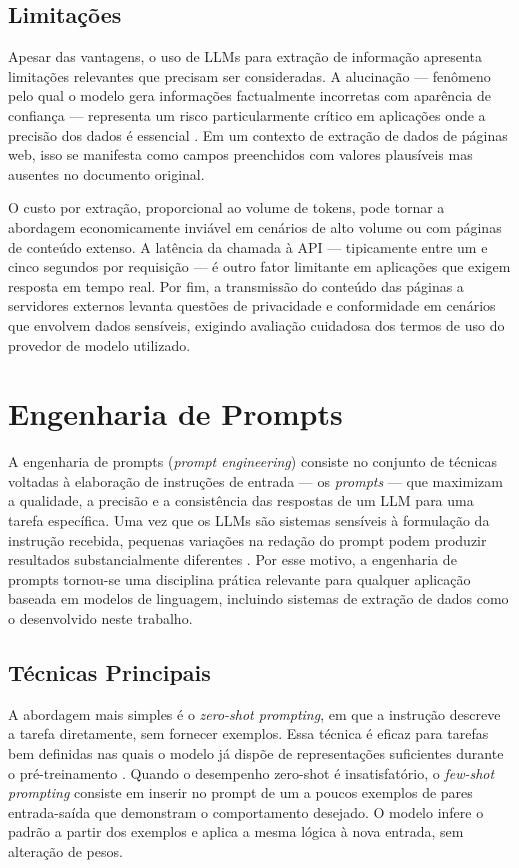 \documentclass[tcc,capa]{texifsul}
\begin{document}
\subsection*{Limitações}

Apesar das vantagens, o uso de LLMs para extração de informação apresenta limitações relevantes que precisam ser consideradas. A alucinação — fenômeno pelo qual o modelo gera informações factualmente incorretas com aparência de confiança — representa um risco particularmente crítico em aplicações onde a precisão dos dados é essencial \cite{OpenAI2023}. Em um contexto de extração de dados de páginas web, isso se manifesta como campos preenchidos com valores plausíveis mas ausentes no documento original.

O custo por extração, proporcional ao volume de tokens, pode tornar a abordagem economicamente inviável em cenários de alto volume ou com páginas de conteúdo extenso. A latência da chamada à API — tipicamente entre um e cinco segundos por requisição — é outro fator limitante em aplicações que exigem resposta em tempo real. Por fim, a transmissão do conteúdo das páginas a servidores externos levanta questões de privacidade e conformidade em cenários que envolvem dados sensíveis, exigindo avaliação cuidadosa dos termos de uso do provedor de modelo utilizado.

\section{Engenharia de Prompts}

A engenharia de prompts (\textit{prompt engineering}) consiste no conjunto de técnicas voltadas à elaboração de instruções de entrada — os \textit{prompts} — que maximizam a qualidade, a precisão e a consistência das respostas de um LLM para uma tarefa específica. Uma vez que os LLMs são sistemas sensíveis à formulação da instrução recebida, pequenas variações na redação do prompt podem produzir resultados substancialmente diferentes \cite{Zhao2023}. Por esse motivo, a engenharia de prompts tornou-se uma disciplina prática relevante para qualquer aplicação baseada em modelos de linguagem, incluindo sistemas de extração de dados como o desenvolvido neste trabalho.

\subsection*{Técnicas Principais}

A abordagem mais simples é o \textit{zero-shot prompting}, em que a instrução descreve a tarefa diretamente, sem fornecer exemplos. Essa técnica é eficaz para tarefas bem definidas nas quais o modelo já dispõe de representações suficientes durante o pré-treinamento \cite{Brown2020}. Quando o desempenho zero-shot é insatisfatório, o \textit{few-shot prompting} consiste em inserir no prompt de um a poucos exemplos de pares entrada-saída que demonstram o comportamento desejado. O modelo infere o padrão a partir dos exemplos e aplica a mesma lógica à nova entrada, sem alteração de pesos.
\end{document}
